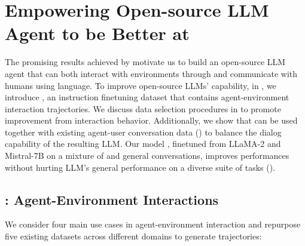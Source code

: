 \section{Empowering Open-source LLM Agent to be Better at \approach}
\label{sec:data_and_evaluation}
\label{sec:llm_agent_framework_capability}

The promising results achieved by \approach motivate us to build an open-source LLM agent that can both interact with environments through \approach and communicate with humans using language.
% 
To improve open-source LLMs' \approach capability, in , we introduce \dataname, an instruction finetuning dataset that contains agent-environment interaction trajectories.
% 
We discuss data selection procedures in  to promote improvement from interaction behavior.
% 
Additionally, we show that \approach can be used together with existing agent-user conversation data () to balance the dialog capability of the resulting LLM.
% 
Our model \modelname, finetuned from LLaMA-2 \citep{touvron2023llama} and Mistral-7B \citep{jiang2023mistral} on a mixture of \dataname and general conversations, improves \approach performances without hurting LLM's general performance on a diverse suite of tasks ().

\subsection{\dataname: Agent-Environment Interactions}
\label{sec:agent_env_data}

We consider four main use cases in agent-environment interaction and repurpose five existing datasets across different domains to generate trajectories:

